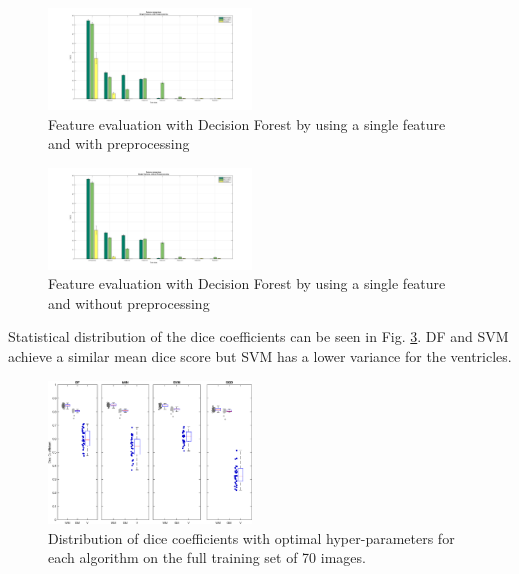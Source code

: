 \documentclass[journal]{IEEEtran}
\begin{document}
\begin{figure}\label{DF_FeatEval_SF_PP}
	\centering
	\includegraphics[width=0.48\textwidth]{images/DF_FeatEval_SF_PP}
	\caption{Feature evaluation with Decision Forest by using a single feature and with preprocessing }
\end{figure}

\begin{figure}\label{DF_FeatEval_SF_NPP}
	\centering
	\includegraphics[width=0.48\textwidth]{images/DF_FeatEval_SF_NPP}
	\caption{Feature evaluation with Decision Forest by using a single feature and without preprocessing }
\end{figure}

Statistical distribution of the dice coefficients can be seen in Fig. \ref{f.boxplot}. DF and SVM achieve a similar mean dice score but SVM has a lower variance for the ventricles.
\begin{figure}\label{f.boxplot}
	\centering
	\includegraphics[width=0.48\textwidth]{images/boxplot}
	\caption{Distribution of dice coefficients with optimal hyper-parameters for each algorithm on the full training set of 70 images.}
\end{figure}
\end{document}
